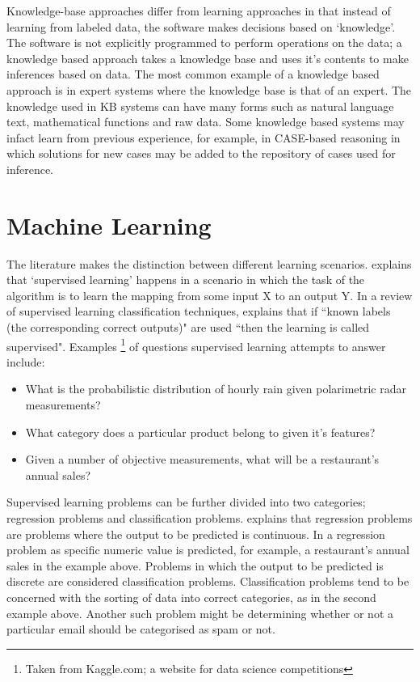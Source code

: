 Knowledge-base approaches differ from learning approaches in that instead of learning from labeled data, the software makes decisions based on `knowledge'. The software is not explicitly programmed to perform operations on the data; a knowledge based approach takes a knowledge base and uses it's contents to make inferences based on data. The most common example of a knowledge based approach is in expert systems where the knowledge base is that of an expert. The knowledge used in KB systems can have many forms such as natural language text, mathematical functions and raw data. Some knowledge based systems may infact learn from previous experience, for example, in CASE-based reasoning in which solutions for new cases may be added to the repository of cases used for inference.

\section{Machine Learning}

The literature makes the distinction between different learning scenarios. \cite{alpaydinintroduction} explains that `supervised learning' happens in a scenario in which the task of the algorithm is to learn the mapping from some input X to an output Y. In a review of supervised learning classification techniques, \cite{kotsiantis2007supervised} explains that if ``known labels (the corresponding correct outputs)" are used ``then the learning is called supervised". Examples \footnote{Taken from Kaggle.com; a website for data science competitions} of questions supervised learning attempts to answer include:

\begin{itemize}
  \item What is the probabilistic distribution of hourly rain given polarimetric radar measurements?
  \item What category does a particular product belong to given it's features?
  \item Given a number of objective measurements, what will be a restaurant's annual sales? 
\end{itemize}

Supervised learning problems can be further divided into two categories; regression problems and classification problems. 
\cite{ng2000cs229} explains that regression problems are problems where the output to be predicted is continuous. In a regression problem as specific numeric value is predicted, for example, a restaurant's annual sales in the example above. Problems in which the output to be predicted is discrete are considered classification problems. Classification problems tend to be concerned with the sorting of data into correct categories, as in the second example above. Another such problem might be determining whether or not a particular email should be categorised as spam or not.  

